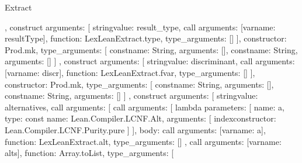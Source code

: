 \begin{lexlean}{Extract}
\begin{toolingmodule}
{{{{{{{                    },
                    construct{
                      arguments: [
                        string{value: result_type},
                        call{
                          arguments: [var{name: resultType}],
                          function: LexLeanExtract.type,
                          type_arguments: []
                        }
                      ],
                      constructor: Prod.mk,
                      type_arguments: [
                        const{name: String, arguments: []},
                        const{name: String, arguments: []}
                      ]
                    },
                    construct{
                      arguments: [
                        string{value: discriminant},
                        call{
                          arguments: [var{name: discr}],
                          function: LexLeanExtract.fvar,
                          type_arguments: []
                        }
                      ],
                      constructor: Prod.mk,
                      type_arguments: [
                        const{name: String, arguments: []},
                        const{name: String, arguments: []}
                      ]
                    },
                    construct{
                      arguments: [
                        string{value: alternatives},
                        call{
                          arguments: [
                            call{
                              arguments: [
                                lambda{
                                  parameters: [
                                    {
                                      name: a,
                                      type: const{
                                        name: Lean.Compiler.LCNF.Alt,
                                        arguments: [
                                          index{constructor: Lean.Compiler.LCNF.Purity.pure}
                                        ]
                                      }
                                    }
                                  ],
                                  body: call{
                                    arguments: [var{name: a}],
                                    function: LexLeanExtract.alt,
                                    type_arguments: []
                                  }
                                },
                                call{
                                  arguments: [var{name: alts}],
                                  function: Array.toList,
                                  type_arguments: [
}}}}}}}}}}
\end{toolingmodule}
\end{lexlean}
